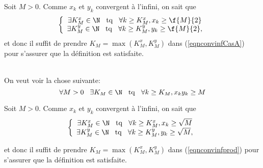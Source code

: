 \noindent Soit $M> 0$. Comme $x_k$ et $y_k$ convergent à l'infini, on sait que 
\[\left\{\begin{array}{c}   
         \exists K^x_M \in \N \hspace{0.3cm} {\rm tq} \hspace{0.3cm} \forall k \geq K^x_M, x_k \geq \f{M}{2}\\																		 
        \exists K^y_M \in \N \hspace{0.3cm} {\rm tq} \hspace{0.3cm} \forall k \geq K^y_M, y_k \geq \f{M}{2},																		
\end{array}\right.\]
et donc il suffit de prendre $K_M = \max(K_M^x, K_M^y)$ dans (\ref{eqnconvinfCasA}) pour s'assurer que la définition est satisfaite.


\vspace{0.5cm}
\\

\noindent On veut voir la chose suivante:
\begin{equation}
 \label{eqnconvinfprod}  \forall M > 0 \hspace{0.3cm} \exists K_M \in \N \hspace{0.3cm} {\rm tq} \hspace{0.3cm} \forall k \geq K_M, x_k  y_k \geq M \end{equation}

\noindent Soit $M> 0$. Comme $x_k$ et $y_k$ convergent à l'infini, on sait que 
\[\left\{\begin{array}{c}   
         \exists K^x_M \in \N \hspace{0.3cm} {\rm tq} \hspace{0.3cm} \forall k \geq K^x_M, x_k \geq \sqrt M\\																		 
        \exists K^y_M \in \N \hspace{0.3cm} {\rm tq} \hspace{0.3cm} \forall k \geq K^y_M, y_k \geq \sqrt M,																		
\end{array}\right.\]

\noindent et donc il suffit  de prendre  $K_M = \max(K_M^x, K_M^y)$ dans (\ref{eqnconvinfprod}) pour s'assurer que la définition est satisfaite.

\vspace{0.5cm}
\\

